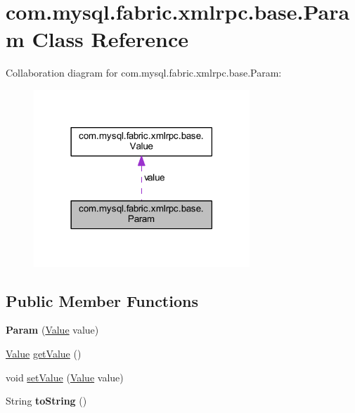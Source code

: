 \hypertarget{classcom_1_1mysql_1_1fabric_1_1xmlrpc_1_1base_1_1_param}{}\section{com.\+mysql.\+fabric.\+xmlrpc.\+base.\+Param Class Reference}
\label{classcom_1_1mysql_1_1fabric_1_1xmlrpc_1_1base_1_1_param}


Collaboration diagram for com.\+mysql.\+fabric.\+xmlrpc.\+base.\+Param\+:\nopagebreak
\begin{figure}[H]
\begin{center}
\leavevmode
\includegraphics[width=230pt]{classcom_1_1mysql_1_1fabric_1_1xmlrpc_1_1base_1_1_param__coll__graph}
\end{center}
\end{figure}
\subsection*{Public Member Functions}
\begin{DoxyCompactItemize}
\item 
\mbox{\label{classcom_1_1mysql_1_1fabric_1_1xmlrpc_1_1base_1_1_param_aca41921d25eedacc9bc2871e2757795c}} 
{\bfseries Param} (\mbox{\hyperlink{classcom_1_1mysql_1_1fabric_1_1xmlrpc_1_1base_1_1_value}{Value}} value)
\item 
\mbox{\hyperlink{classcom_1_1mysql_1_1fabric_1_1xmlrpc_1_1base_1_1_value}{Value}} \mbox{\hyperlink{classcom_1_1mysql_1_1fabric_1_1xmlrpc_1_1base_1_1_param_a900a547d8eee46bffc36a3b6dae26732}{get\+Value}} ()
\item 
void \mbox{\hyperlink{classcom_1_1mysql_1_1fabric_1_1xmlrpc_1_1base_1_1_param_a05bd730ae6c96273ac1edbb362045867}{set\+Value}} (\mbox{\hyperlink{classcom_1_1mysql_1_1fabric_1_1xmlrpc_1_1base_1_1_value}{Value}} value)
\item 
\mbox{\label{classcom_1_1mysql_1_1fabric_1_1xmlrpc_1_1base_1_1_param_a090825d083eac40412ceffe9449ce4ee}} 
String {\bfseries to\+String} ()
\end{DoxyCompactItemize}
